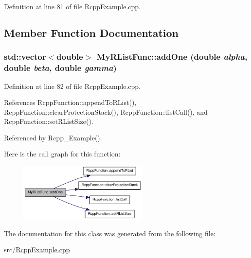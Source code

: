 Definition at line 81 of file RcppExample.cpp.

\subsection{Member Function Documentation}
\hypertarget{classMyRListFunc_a0dec3b59e1e235c0502594a5d92cae13}{
\subsubsection[{addOne}]{\setlength{\rightskip}{0pt plus 5cm}std::vector$<$double$>$ MyRListFunc::addOne (double {\em alpha}, \/  double {\em beta}, \/  double {\em gamma})}}
\label{classMyRListFunc_a0dec3b59e1e235c0502594a5d92cae13}


Definition at line 82 of file RcppExample.cpp.

References RcppFunction::appendToRList(), RcppFunction::clearProtectionStack(), RcppFunction::listCall(), and RcppFunction::setRListSize().

Referenced by Rcpp\_\-Example().

Here is the call graph for this function:\nopagebreak
\begin{figure}[H]
\begin{center}
\leavevmode
\includegraphics[width=183pt]{classMyRListFunc_a0dec3b59e1e235c0502594a5d92cae13_cgraph}
\end{center}
\end{figure}


The documentation for this class was generated from the following file:\begin{DoxyCompactItemize}
\item 
src/\hyperlink{RcppExample_8cpp}{RcppExample.cpp}\end{DoxyCompactItemize}
